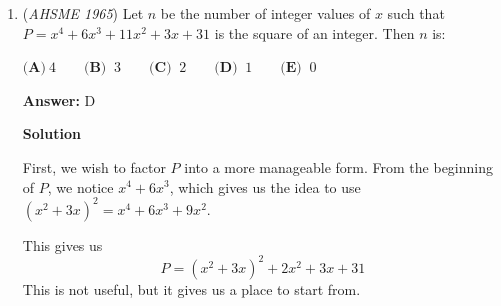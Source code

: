 \begin{enumerate}
 



\textbf{Solution 2 (Overkill?)}

This is Descartes' formula for four mutually tangent circles with radii $r_1,r_2,r_3,r_4$

 Let $k_i$ denote $\frac{1}{r_i}$. This is the curvature.

 Note: A negative radius means that the other circles are internally tangent to it.

 Then,

 $(k_1+k_2+k_3+k_4)^2=2(k_1^2+k_2^2+k_3^2+k_4^2)$

 First, scale the problem up by two, so the radii are 1",2",3", and d"

 Next, let $k$ be $\frac{1}{d}$

 Using the formula, we get:

 $\left(\frac{7}{6}+k\right)=2(\frac{49}{36}+k^2)$
$\frac{49}{36}+\frac{7}{3}k+k^2=\frac{98}{36}+2k^2$

 (You'll see why I didn't simplify $\frac{98}{36}$)

 $k^2-\frac{7}{3}-\frac{49}{36}=0$

 Using the quadratic formula:

 $k=\frac{\frac{7}{3}\pm\sqrt{\frac{49}{9}-4\cdot1\cdot\frac{49}{36}}}{2}$
$k=\frac{\frac{7}{3}\pm\sqrt{\frac{49}{9}-\frac{49}{9}}}{2}$
$k=\frac{\frac{7}{3}\pm\sqrt{0}}{2}$
$k=\frac{\frac{7}{3}\pm0}{2}$
$k=\frac{\frac{7}{3}}{2}$
$k=\frac{7}{6}$

 So the diameter $d=\frac{6}{7}$, which is about $\boxed{(\textbf{B}).86}$



	\item (\textit{AHSME 1965}) Let $n$ be the number of integer values of $x$ such that $P = x^4 + 6x^3 + 11x^2 + 3x + 31$ is the square of an integer. Then $n$ is: 


 $\textbf{(A)}\ 4 \qquad  \textbf{(B) }\ 3 \qquad  \textbf{(C) }\ 2 \qquad  \textbf{(D) }\ 1 \qquad  \textbf{(E) }\ 0$

 \textbf{Answer: }D



\textbf{Solution}

First, we wish to factor $P$ into a more manageable form. From the beginning of $P$, we notice $x^4+6x^3$, which gives us the idea to use $(x^2+3x)^2=x^4+6x^3+9x^2$. 

 This gives us 
 \[P=(x^2+3x)^2+2x^2+3x+31\]This is not useful, but it gives us a place to start from. 


\end{enumerate}

